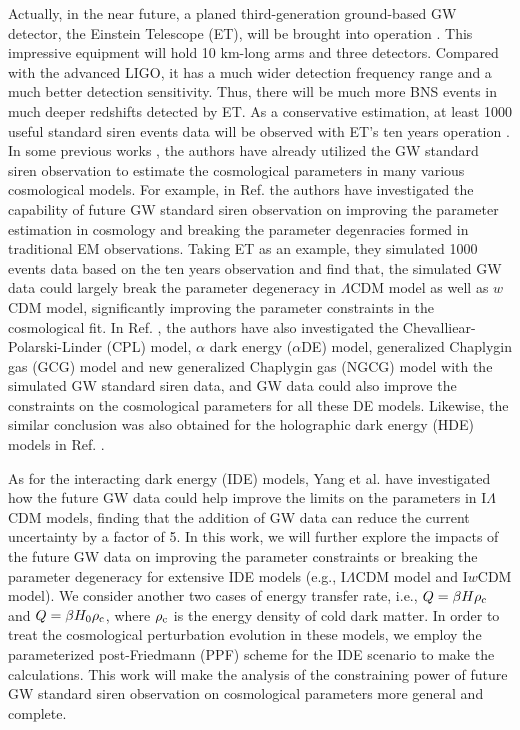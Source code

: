 \documentclass[aps,prd,nofootinbib,amsmath,amssymb,superscriptaddress,twocolumn,10pt]{revtex4}%
\newcommand{\red}{\textcolor[rgb]{1.00,0.00,0.00}}
\begin{document}
Actually, in the near future, a planed third-generation ground-based GW detector, the Einstein Telescope (ET), will be brought into operation \cite{ET}. This impressive equipment will hold 10 km-long arms and three detectors. Compared with the advanced LIGO, it has a much wider detection frequency range and a much better detection sensitivity. Thus, there will be much more BNS events in much deeper redshifts detected by ET. As a conservative estimation, at least 1000 useful standard siren events data will be observed with ET's ten years operation \cite{Zhang:2018byx}.
In some previous works \cite{Zhao:2018gwk,Du:2018tia,Zhang:2018byx,Zhang:2019ple,Yang:2019bpr,Yang:2019vni,Bachega:2019fki,Zhang:2019loq,Zhang:2019ylr,Chang:2019xcb,He:2019dhl}, the authors have already utilized the GW standard siren observation to estimate the cosmological parameters in many various cosmological models. For example, in Ref. \cite{Zhang:2018byx} the authors have investigated the capability of future GW standard siren observation on improving the parameter estimation in cosmology and breaking the parameter degenracies formed in traditional EM observations. Taking ET as an example, they simulated 1000 events data based on the ten years observation and find that, the simulated GW data could largely break the parameter degeneracy in $\Lambda$CDM model as well as $w$CDM model, significantly improving the parameter constraints in the cosmological fit. In Ref. \cite{Zhang:2019loq}, the authors have also investigated the Chevalliear-Polarski-Linder (CPL) model, $\alpha$ dark energy ($\alpha$DE) model, generalized Chaplygin gas (GCG) model and new generalized Chaplygin gas (NGCG) model with the simulated GW standard siren data, and GW data could also improve the constraints on the cosmological parameters for all these DE models. Likewise, the similar conclusion was also obtained for the holographic dark energy (HDE) models in Ref. \cite{Zhang:2019ple}. 

\red{As for the interacting dark energy (IDE) models, Yang et al. \cite{Yang:2019vni} have investigated how the future GW data could help improve the limits on the parameters in I$\Lambda$CDM models, finding that the addition of GW data can reduce the current uncertainty by a factor of 5. 
In this work, we will further explore the impacts of the future GW data on improving the parameter constraints or breaking the parameter degeneracy for extensive IDE models (e.g., I$\Lambda$CDM model and I$w$CDM model).}
We consider another two cases of energy transfer rate, i.e., $Q=\beta H \rho_{\rm c}$ and $Q=\beta H_{0} \rho_{\rm c}$, where $\rho_{\rm c}$ is the energy density of cold dark matter. In order to treat the cosmological perturbation evolution in these models, we employ the parameterized post-Friedmann (PPF) scheme for the IDE scenario \cite{Li:2014eha} to make the calculations. This work will make the analysis of the constraining power of future GW standard siren observation on cosmological parameters more general and complete.
\end{document}
